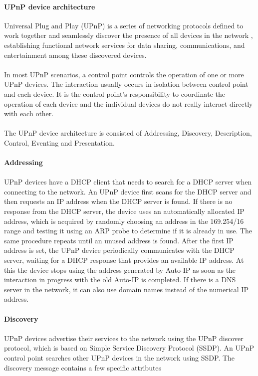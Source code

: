 \paragraph{UPnP device architecture}
Universal Plug and Play (UPnP) is a series of networking protocols defined to 
work together and seamlessly discover the presence of all devices in the network 
, establishing functional network services for data sharing, communications, and 
entertainment among these discovered devices.\\
\\ 
In most UPnP scenarios, a control point controls the operation of one or more 
UPnP devices. The interaction usually occurs in isolation between control point 
and each device. It is the control point's responsibility to coordinate the operation of 
each device and the individual devices do not really interact directly with each other. \\
\\
The UPnP device architecture \cite{upnp} \label{upnp} \label{upnpdevice} 
is consisted of Addressing, Discovery, Description, Control, Eventing and
Presentation.\\
\\
\textbf{Addressing} \\ 
\\
UPnP devices have a DHCP client that needs to search for a DHCP server when
connecting to the network. An UPnP device first scans for the DHCP server and
then requests an IP address when the DHCP server is found. If there is no response from the DHCP server, the device uses an automatically allocated IP address, which is acquired by randomly choosing an address in the 169.254/16 range and testing it using an ARP probe to determine if it is already in use. The same procedure repeats until an unused address is found. After the first IP address is set, the UPnP device periodically communicates with the DHCP server, waiting for a DHCP response that provides an available IP address. At this the device stops using the address generated by Auto-IP as soon as the interaction in progress with the old Auto-IP is completed. If there is a DNS server in the network, it can also use domain names instead of the numerical IP address.\\
\\ 
\textbf{Discovery} \\ 
\\
UPnP devices advertise their services to the network using the UPnP discover protocol, which is based on 
Simple Service Discovery Protocol (SSDP). An UPnP control point searches other UPnP devices in the network using SSDP. The discovery message contains a few specific attributes 
